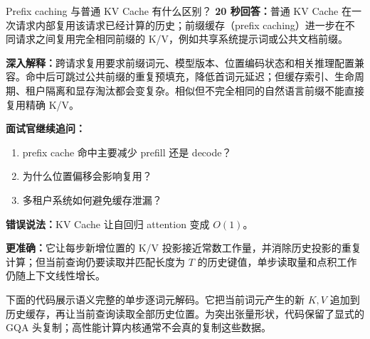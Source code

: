 \begin{interviewbox}{Prefix caching 与普通 KV Cache 有什么区别？}
\textbf{20 秒回答：}普通 KV Cache 在一次请求内部复用该请求已经计算的历史；前缀缓存（prefix caching）进一步在不同请求之间复用完全相同前缀的 K/V，例如共享系统提示词或公共文档前缀。

\textbf{深入解释：}跨请求复用要求前缀词元、模型版本、位置编码状态和相关推理配置兼容。命中后可跳过公共前缀的重复预填充，降低首词元延迟；但缓存索引、生命周期、租户隔离和显存淘汰都会变复杂。相似但不完全相同的自然语言前缀不能直接复用精确 K/V。

\textbf{面试官继续追问：}
\begin{enumerate}
  \item prefix cache 命中主要减少 prefill 还是 decode？
  \item 为什么位置偏移会影响复用？
  \item 多租户系统如何避免缓存泄漏？
\end{enumerate}
\end{interviewbox}

\begin{wrongbox}
\textbf{错误说法：}KV Cache 让自回归 attention 变成 $O(1)$。

\textbf{更准确：}它让每步新增位置的 K/V 投影接近常数工作量，并消除历史投影的重复计算；但当前查询仍要读取并匹配长度为 $T$ 的历史键值，单步读取量和点积工作仍随上下文线性增长。
\end{wrongbox}


下面的代码展示语义完整的单步逐词元解码。它把当前词元产生的新 $K,V$ 追加到历史缓存，再让当前查询读取全部历史位置。为突出张量形状，代码保留了显式的 GQA 头复制；高性能计算内核通常不会真的复制这些数据。

